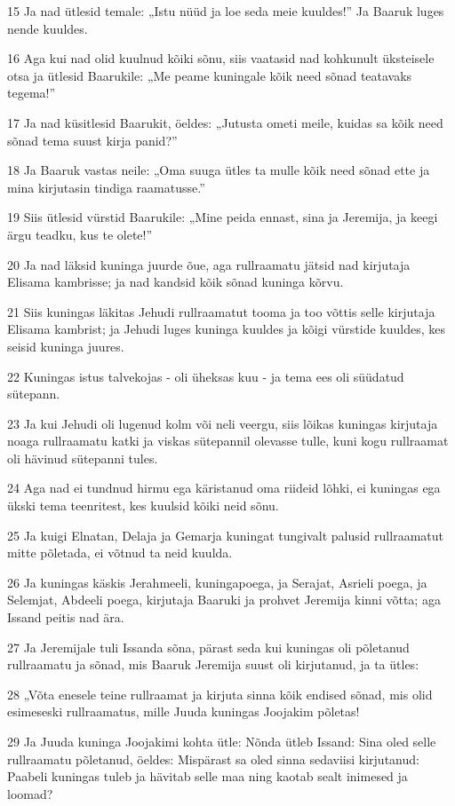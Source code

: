 \par 15 Ja nad ütlesid temale: „Istu nüüd ja loe seda meie kuuldes!” Ja Baaruk luges nende kuuldes.
\par 16 Aga kui nad olid kuulnud kõiki sõnu, siis vaatasid nad kohkunult üksteisele otsa ja ütlesid Baarukile: „Me peame kuningale kõik need sõnad teatavaks tegema!”
\par 17 Ja nad küsitlesid Baarukit, öeldes: „Jutusta ometi meile, kuidas sa kõik need sõnad tema suust kirja panid?”
\par 18 Ja Baaruk vastas neile: „Oma suuga ütles ta mulle kõik need sõnad ette ja mina kirjutasin tindiga raamatusse.”
\par 19 Siis ütlesid vürstid Baarukile: „Mine peida ennast, sina ja Jeremija, ja keegi ärgu teadku, kus te olete!”
\par 20 Ja nad läksid kuninga juurde õue, aga rullraamatu jätsid nad kirjutaja Elisama kambrisse; ja nad kandsid kõik sõnad kuninga kõrvu.
\par 21 Siis kuningas läkitas Jehudi rullraamatut tooma ja too võttis selle kirjutaja Elisama kambrist; ja Jehudi luges kuninga kuuldes ja kõigi vürstide kuuldes, kes seisid kuninga juures.
\par 22 Kuningas istus talvekojas - oli üheksas kuu - ja tema ees oli süüdatud sütepann.
\par 23 Ja kui Jehudi oli lugenud kolm või neli veergu, siis lõikas kuningas kirjutaja noaga rullraamatu katki ja viskas sütepannil olevasse tulle, kuni kogu rullraamat oli hävinud sütepanni tules.
\par 24 Aga nad ei tundnud hirmu ega käristanud oma riideid lõhki, ei kuningas ega ükski tema teenritest, kes kuulsid kõiki neid sõnu.
\par 25 Ja kuigi Elnatan, Delaja ja Gemarja kuningat tungivalt palusid rullraamatut mitte põletada, ei võtnud ta neid kuulda.
\par 26 Ja kuningas käskis Jerahmeeli, kuningapoega, ja Serajat, Asrieli poega, ja Selemjat, Abdeeli poega, kirjutaja Baaruki ja prohvet Jeremija kinni võtta; aga Issand peitis nad ära.
\par 27 Ja Jeremijale tuli Issanda sõna, pärast seda kui kuningas oli põletanud rullraamatu ja sõnad, mis Baaruk Jeremija suust oli kirjutanud, ja ta ütles:
\par 28 „Võta enesele teine rullraamat ja kirjuta sinna kõik endised sõnad, mis olid esimeseski rullraamatus, mille Juuda kuningas Joojakim põletas!
\par 29 Ja Juuda kuninga Joojakimi kohta ütle: Nõnda ütleb Issand: Sina oled selle rullraamatu põletanud, öeldes: Mispärast sa oled sinna sedaviisi kirjutanud: Paabeli kuningas tuleb ja hävitab selle maa ning kaotab sealt inimesed ja loomad?
